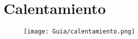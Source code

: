 \section{Calentamiento}

\begin{figure}[h]
    \centering
    \texttt{[image: Guia/calentamiento.png]}
\end{figure}